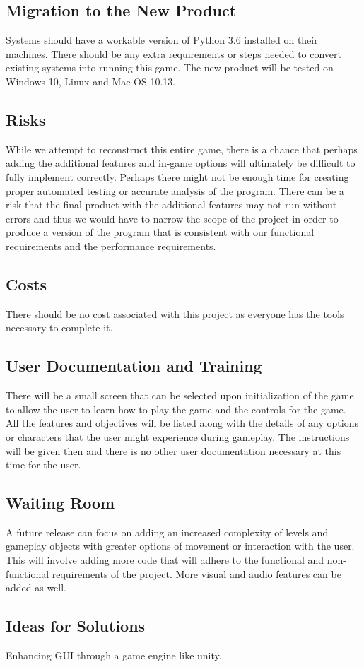 \documentclass[12pt, titlepage]{article}
\begin{document}
\subsection{Migration to the New Product}
Systems should have a workable version of Python 3.6 installed on their machines. There should be any extra requirements or steps needed to convert existing systems into running this game. The new product will be tested on Windows 10, Linux and Mac OS 10.13. 

\subsection{Risks}
While we attempt to reconstruct this entire game, there is a chance that perhaps adding the additional features and in-game options will ultimately be difficult to fully implement correctly. Perhaps there might not be enough time for creating proper automated testing or accurate analysis of the program. There can be a risk that the final product with the additional features may not run without errors and thus we would have to narrow the scope of the project in order to produce a version of the program that is consistent with our functional requirements and the performance requirements. 

\subsection{Costs}
There should be no cost associated with this project as everyone has the tools necessary to complete it.

\subsection{User Documentation and Training}
There will be a small screen that can be selected upon initialization of the game to allow the user to learn how to play the game and the controls for the game. All the features and objectives will be listed along with the details of any options or characters that the user might experience during gameplay. The instructions will be given then and there is no other user documentation necessary at this time for the user. 

\subsection{Waiting Room}
A future release can focus on adding an increased complexity of levels and gameplay objects with greater options of movement or interaction with the user. This will involve adding more code that will adhere to the functional and non-functional requirements of the project. More visual and audio features can be added as well. 

\subsection{Ideas for Solutions}
Enhancing GUI through a game engine like unity.





\newpage
\end{document}

